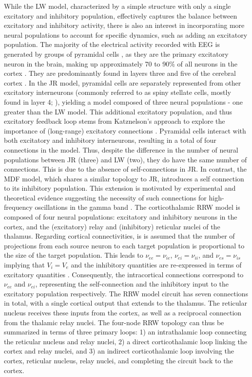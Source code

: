 \documentclass[12pt,twoside]{article}
\begin{document}
While the LW model, characterized by a simple structure with only a single excitatory and inhibitory population, effectively captures the balance between excitatory and inhibitory activity, there is also an interest in incorporating more neural populations to account for specific dynamics, such as adding an excitatory population. The majority of the electrical activity recorded with EEG is generated by groups of pyramidal cells \citep{louis2016appendix}, as they are the primary excitatory neuron in the brain, making up approximately 70 to 90\% of all neurons in the cortex \citep{elston2007specialization}. They are predominantly found in layers three and five of the cerebral cortex \citep{louis2016appendix}. In the JR model, pyramidal cells are separately represented from other excitatory interneurons (commonly referred to as spiny stellate cells, mostly found in layer 4; \citealp{david2006mechanisms}), yielding a model composed of three neural populations - one greater than the LW model. This additional excitatory population, and thus excitatory feedback loop stems from Katznelson's approach to explore the importance of (long-range) excitatory connections \citep{jansen1993neurophysiologically,katznelson1981normal}. Pyramidal cells interact with both excitatory and inhibitory interneurons, resulting in a total of four connections in the model. Thus, despite the difference in the number of neural populations between JR (three) and LW (two), they do have the same number of connections. This is due to the absence of self-connections in JR. In contrast, the MDF model, which shares a similar topology to JR, introduces a self connection to its inhibitory population. This extension is motivated by experimental and theoretical evidence suggesting the necessity of such connections for high-frequency oscillations in the gamma band \citep{moran2007neural}. The corticothalamic RRW model is composed of four neural populations: excitatory and inhibitory neurons in the cortex, and the (excitatory) relay and (inhibitory) reticular nuclei of the thalamus. Regarding cortical connectivities, is is assumed that the number of projections from each source neuron to each target population is proportional to the size of the target population. This leads to $\nu_{ee} = \nu_{ie}$, $\nu_{ei} = \nu_{ii}$, and $\nu_{es} = \nu_{is}$ implying that $V_{i} = V_{e}$ and the inhibitory quantities are re-expressed in terms of excitatory quantities \citep{zhao2015generalized}. Consequently, the intracortical connections correspond to $\nu_{ee}$ and $\nu_{ei}$, representing the self-connection and the inhibitory input to the excitatory population respectively. The RRW model circuit has seven connections in total, with a single cortical output that extends to the thalamus. The reticular nucleus receives these inputs from the cortex, as well as a reciprocal connection from the thalamic relay nuclei. The four-node RRW topology can thus be summarized in terms of three primary loops: 1) an intrathalamic loop connecting the reticular nucleus and relay nuclei, 2) a direct corticothalamic loop linking the cortex and relay nuclei, and 3) an indirect corticothalamic loop involving the cortex, reticular nucleus, relay nuclei, and completing the circuit back to the cortex.
\end{document}
